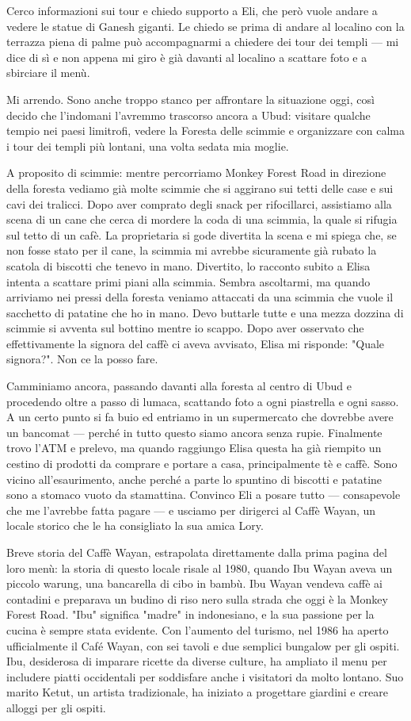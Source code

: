 Cerco informazioni sui tour e chiedo supporto a Eli, che però vuole andare a vedere le statue di Ganesh giganti. Le chiedo se prima di andare al localino con la terrazza piena di palme può accompagnarmi a chiedere dei tour dei templi — mi dice di sì e non appena mi giro è già davanti al localino a scattare foto e a sbirciare il menù.

Mi arrendo. Sono anche troppo stanco per affrontare la situazione oggi, così decido che l'indomani l'avremmo trascorso ancora a Ubud: visitare qualche tempio nei paesi limitrofi, vedere la Foresta delle scimmie e organizzare con calma i tour dei templi più lontani, una volta sedata mia moglie.

A proposito di scimmie: mentre percorriamo Monkey Forest Road in direzione della foresta vediamo già molte scimmie che si aggirano sui tetti delle case e sui cavi dei tralicci. Dopo aver comprato degli snack per rifocillarci, assistiamo alla scena di un cane che cerca di mordere la coda di una scimmia, la quale si rifugia sul tetto di un cafè. La proprietaria si gode divertita la scena e mi spiega che, se non fosse stato per il cane, la scimmia mi avrebbe sicuramente già rubato la scatola di biscotti che tenevo in mano. Divertito, lo racconto subito a Elisa intenta a scattare primi piani alla scimmia. Sembra ascoltarmi, ma quando arriviamo nei pressi della foresta veniamo attaccati da una scimmia che vuole il sacchetto di patatine che ho in mano. Devo buttarle tutte e una mezza dozzina di scimmie si avventa sul bottino mentre io scappo. Dopo aver osservato che effettivamente la signora del caffè ci aveva avvisato, Elisa mi risponde: "Quale signora?". Non ce la posso fare.

Camminiamo ancora, passando davanti alla foresta al centro di Ubud e procedendo oltre a passo di lumaca, scattando foto a ogni piastrella e ogni sasso. A un certo punto si fa buio ed entriamo in un supermercato che dovrebbe avere un bancomat — perché in tutto questo siamo ancora senza rupie. Finalmente trovo l'ATM e prelevo, ma quando raggiungo Elisa questa ha già riempito un cestino di prodotti da comprare e portare a casa, principalmente tè e caffè. Sono vicino all'esaurimento, anche perché a parte lo spuntino di biscotti e patatine sono a stomaco vuoto da stamattina. Convinco Eli a posare tutto — consapevole che me l'avrebbe fatta pagare — e usciamo per dirigerci al Caffè Wayan, un locale storico che le ha consigliato la sua amica Lory.

Breve storia del Caffè Wayan, estrapolata direttamente dalla prima pagina del loro menù: la storia di questo locale risale al 1980, quando Ibu Wayan aveva un piccolo warung, una bancarella di cibo in bambù. Ibu Wayan vendeva caffè ai contadini e preparava un budino di riso nero sulla strada che oggi è la Monkey Forest Road. "Ibu" significa "madre" in indonesiano, e la sua passione per la cucina è sempre stata evidente. Con l'aumento del turismo, nel 1986 ha aperto ufficialmente il Café Wayan, con sei tavoli e due semplici bungalow per gli ospiti. Ibu, desiderosa di imparare ricette da diverse culture, ha ampliato il menu per includere piatti occidentali per soddisfare anche i visitatori da molto lontano. Suo marito Ketut, un artista tradizionale, ha iniziato a progettare giardini e creare alloggi per gli ospiti.

